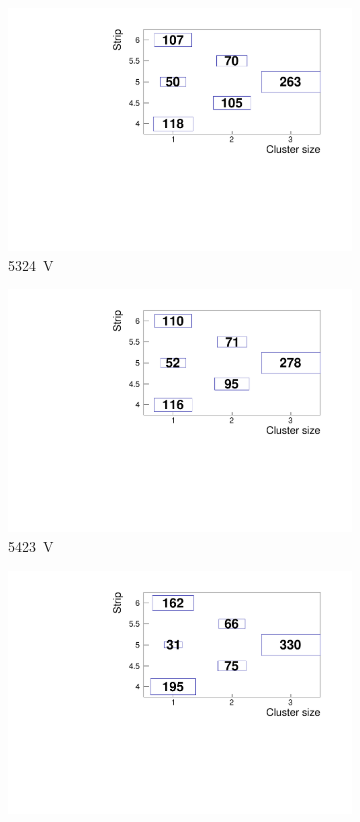 \begin{figure}[H]
\begin{subfigure}{.33\linewidth}
			\includegraphics[width=1.1\linewidth]{fig/chapt6/Muon-ClS-5200-gRPC-INFN.pdf}
			\caption{\label{fig:cluster-size-2D:C} \SI{5324}{V}}
		\end{subfigure}
		\begin{subfigure}{.33\linewidth}
		    \centering
			\includegraphics[width=1.1\linewidth]{fig/chapt6/Muon-ClS-5300-gRPC-INFN.pdf}
			\caption{\label{fig:cluster-size-2D:D} \SI{5423}{V}}
		\end{subfigure}
		\begin{subfigure}{.33\linewidth}
		    \centering
			\includegraphics[width=1.1\linewidth]{fig/chapt6/Muon-ClS-5400-gRPC-INFN.pdf}

\end{subfigure}
\end{figure}
